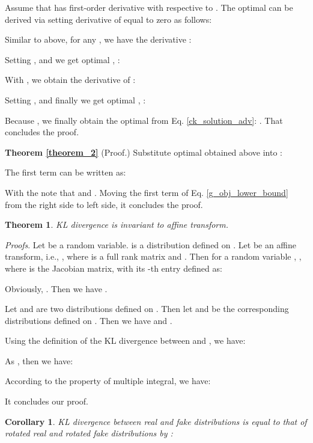 \documentclass{article}
\newtheorem{theorem}{Theorem}
\newtheorem{corollary}{Corollary}
\begin{document}
Assume that  has first-order derivative with respective to . The optimal  can be derived via setting derivative of  equal to zero as follows:



Similar to above, for any , we have the derivative :



Setting , and we get optimal , :



With , we obtain the derivative of :



Setting , and finally we get optimal , :



Because , we finally obtain the optimal  from Eq. \ref{ck_solution_adv}: . That concludes the proof.

\noindent \textbf{Theorem \ref{theorem_2}} (Proof.) Substitute optimal  obtained above into  :



The first term can be written as:



With the note that  and . Moving the first term of Eq. \ref{g_obj_lower_bound} from the right side to left side, it concludes the proof.

\begin{theorem}
KL divergence is invariant to affine transform.
\end{theorem}

\textit{Proofs}. Let  be a random variable. 
is a distribution defined on . Let  be an affine
transform, i.e., ,
where  is a full rank matrix and .
Then for a random variable ,
, where 
is the Jacobian matrix, with its -th entry defined as:

Obviously, . Then we have
.

Let  and  are two distributions
defined on . Then let  and 
be the corresponding distributions defined on .
Then we have 
and .

Using the definition of the KL divergence between  and ,
we have:



As , then we have:



According to the property of multiple integral, we have:



It concludes our proof.

\begin{corollary}
KL divergence between real and fake distributions is equal to that of rotated real and rotated fake distributions by : 
\end{corollary}
\end{document}
